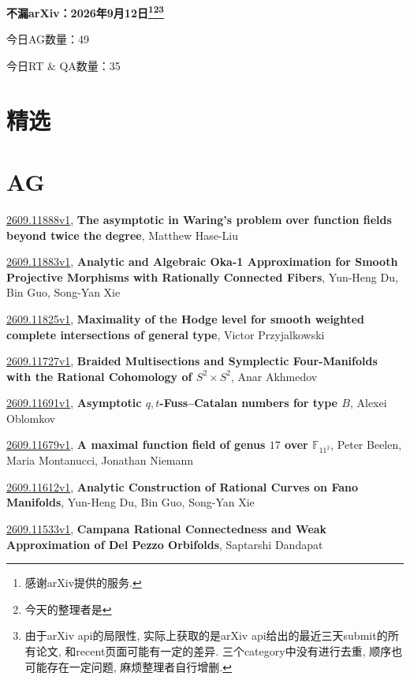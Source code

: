 \documentclass[9pt, a4paper]{article}
\theoremstyle{plain}
\theoremstyle{definition}
\theoremstyle{remark}
\newcommand{\arxiv}[3]{\href{https://arxiv.org/abs/#1}{#1}, \textbf{\textcolor{arxivblue}{#2}}, #3}
\newcommand{\AGnumber}{49}
\newcommand{\RTQAnumber}{35}
\newcommand{\NewestDate}{2026年9月12日}
\newcommand{\todayarXiver}{} %
\begin{document}
\begin{center}
    \Huge\textbf{不漏arXiv：\NewestDate\footnote{感谢arXiv提供的服务.}\footnote{今天的整理者是\todayarXiver}\footnote{由于arXiv api的局限性, 实际上获取的是arXiv api给出的最近三天submit的所有论文, 和recent页面可能有一定的差异. 三个category中没有进行去重, 顺序也可能存在一定问题, 麻烦整理者自行增删.}} \\
\end{center}

\setcounter{section}{-1}

\begin{center}
    今日AG数量：\AGnumber
    
    今日RT \& QA数量：\RTQAnumber
    
\end{center}


\section{精选}


\section{AG}
\arxiv{2609.11888v1}{The asymptotic in Waring's problem over function fields beyond twice the degree}{Matthew Hase-Liu}

\arxiv{2609.11883v1}{Analytic and Algebraic Oka-1 Approximation for Smooth Projective Morphisms with Rationally Connected Fibers}{Yun-Heng Du, Bin Guo, Song-Yan Xie}

\arxiv{2609.11825v1}{Maximality of the Hodge level for smooth weighted complete intersections of general type}{Victor Przyjalkowski}

\arxiv{2609.11727v1}{Braided Multisections and Symplectic Four-Manifolds with the Rational Cohomology of $S^2\times S^2$}{Anar Akhmedov}

\arxiv{2609.11691v1}{Asymptotic $q,t$-Fuss--Catalan numbers for type $B$}{Alexei Oblomkov}

\arxiv{2609.11679v1}{A maximal function field of genus $17$ over $\mathbb{F}_{11^2}$}{Peter Beelen, Maria Montanucci, Jonathan Niemann}

\arxiv{2609.11612v1}{Analytic Construction of Rational Curves on Fano Manifolds}{Yun-Heng Du, Bin Guo, Song-Yan Xie}

\arxiv{2609.11533v1}{Campana Rational Connectedness and Weak Approximation of Del Pezzo Orbifolds}{Saptarshi Dandapat}
\end{document}
